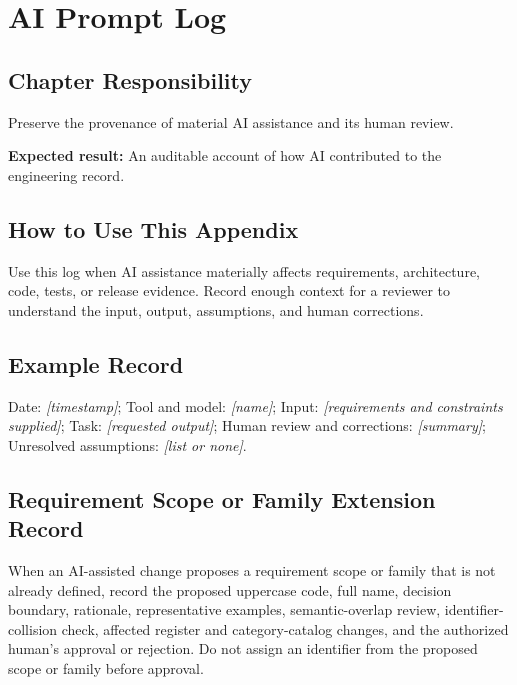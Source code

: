 \chapter{AI Prompt Log}
\section{Chapter Responsibility}
\label{Section:AIPromptLogResponsibility}
Preserve the provenance of material AI assistance and its human review.

\noindent\textbf{Expected result:} An auditable account of how AI contributed to the engineering record.

\section{How to Use This Appendix}
Use this log when AI assistance materially affects requirements, architecture, code, tests, or release evidence. Record enough context for a reviewer to understand the input, output, assumptions, and human corrections.
\section{Example Record}
Date: \textit{[timestamp]}; Tool and model: \textit{[name]}; Input: \textit{[requirements and constraints supplied]}; Task: \textit{[requested output]}; Human review and corrections: \textit{[summary]}; Unresolved assumptions: \textit{[list or none]}.

\section{Requirement Scope or Family Extension Record}
When an AI-assisted change proposes a requirement scope or family that is not
already defined, record the proposed uppercase code, full name, decision
boundary, rationale, representative examples, semantic-overlap review,
identifier-collision check, affected register and category-catalog changes, and
the authorized human's approval or rejection. Do not assign an identifier from
the proposed scope or family before approval.

